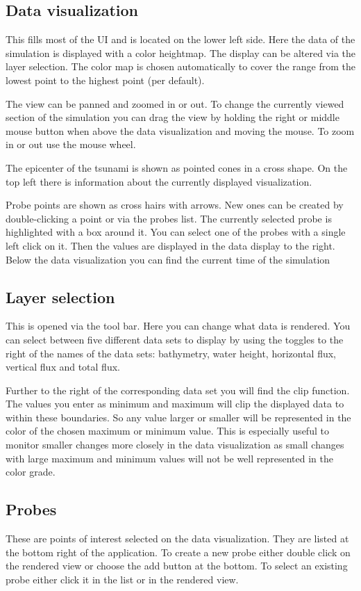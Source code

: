\documentclass[paper=a4]{proc}
\begin{document}
			
		\subsection{Data visualization}
		This fills most of the UI and is located on the lower left side. Here the data of the simulation is displayed with a color heightmap. The display can be altered via the layer selection. The color map is chosen automatically to cover the range from the lowest point to the highest point (per default). 
		
		The view can be panned and zoomed in or out. To change the currently viewed section of the simulation you can drag the view by holding the right or middle mouse button when above the data visualization and moving the mouse. To zoom in or out use the mouse wheel.

The epicenter of the tsunami is shown as pointed cones in a cross shape. On the top left there is information about the currently displayed visualization.
		
		Probe points are shown as cross hairs with arrows. New ones can be created by double-clicking a point or via the probes list. The currently selected probe is highlighted with a box around it. You can select one of the probes with a single left click on it. Then the values are displayed in the data display to the right. Below the data visualization you can find the current time of the simulation
		\subsection{Layer selection}
		This is opened via the tool bar. Here you can change what data is rendered. You can select between five different data sets to display by using the toggles to the right of the names of the data sets: bathymetry, water height, horizontal flux, vertical flux and total flux. 
		
		Further to the right of the corresponding data set you will find the clip function. The values you enter as minimum and maximum will clip the displayed data to within these boundaries. So any value larger or smaller will be represented in the color of the chosen maximum or minimum value. This is especially useful to monitor smaller changes more closely in the data visualization as small changes with large maximum and minimum values will not be well represented in the color grade.
		\subsection{Probes}
		These are points of interest selected on the data visualization. They are listed at the bottom right of the application. To create a new probe either double click on the rendered view or choose the add button at the bottom. To select an existing probe either click it in the list or in the rendered view. 
		
\end{document}
